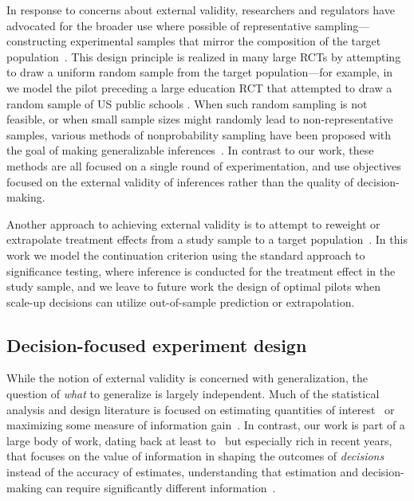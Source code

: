 In response to concerns about external validity, researchers and regulators have advocated for the broader use where possible of representative sampling---constructing experimental samples that mirror the composition of the target population~\cite{Tipton13,FDAHH20}.
This design principle is realized in many large RCTs by attempting to draw a uniform random sample from the target population---for example, in  we model the pilot preceding a large education RCT that attempted to draw a random sample of US public schools \cite{YeagerHa19}.
When such random sampling is not feasible, or when small sample sizes might randomly lead to non-representative samples, various methods of nonprobability sampling have been proposed with the goal of making generalizable inferences~\cite{Tipton13,EgamiLe23,Bouyamourn25}.
In contrast to our work, these methods are all focused on a single round of experimentation, and use objectives focused on the external validity of inferences rather than the quality of decision-making.

Another approach to achieving external validity is to attempt to reweight or extrapolate treatment effects from a study sample to a target population~\cite{TiptonOl18,ZhangHu24,LingMo23}.
In this work we model the continuation criterion using the standard approach to significance testing, where inference is conducted for the treatment effect in the study sample, and we leave to future work the design of optimal pilots when scale-up decisions can utilize out-of-sample prediction or extrapolation.

\subsection{Decision-focused experiment design}

While the notion of external validity is concerned with generalization, the question of \emph{what} to generalize is largely independent.
Much of the statistical analysis and design literature is focused on estimating quantities of interest~\cite{Fisher49,Pukelsheim06} or maximizing some measure of information gain~\cite{ChalonerVe95,RainforthFo23}.
In contrast, our work is part of a large body of work, dating back at least to~\textcite{Blackwell51} but especially rich in recent years, that focuses on the value of information in shaping the outcomes of \emph{decisions} instead of the accuracy of estimates, understanding that estimation and decision-making can require significantly different information~\cite{Fernandez-LoriaPr22,Eckles22}.

